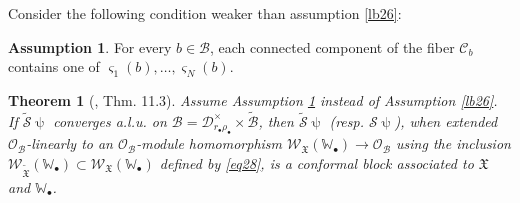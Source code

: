 \documentclass[12pt,a4paper,notitlepage]{article}
\theoremstyle{definition}
\newtheorem{rem}[df]{Remark}
\newtheorem{ass}[df]{Assumption}
\theoremstyle{plain}
\newtheorem{thm}[df]{Theorem}
\newcommand{\fk}{\mathfrak}
\newcommand{\mc}{\mathcal}
\newcommand{\wtd}{\widetilde}
\newcommand{\scr}{\mathscr}
\newcommand{\sgm}{\varsigma}
\newcommand{\blt}{\bullet}
\newcommand{\Wbb}{\mathbb W}
\newcommand{\Mbb}{\mathbb M}
\numberwithin{equation}{section}
\begin{document}

Consider the following condition weaker than assumption \ref{lb26}:
\begin{ass}\label{lb27}
For every $b\in\mc B$, each connected component of the fiber $\mc C_b$ contains one of $\sgm_1(b),\dots,\sgm_N(b)$.
\end{ass}

\begin{thm}[\cite{Gui20}, Thm. 11.3]\label{lb8}
Assume Assumption \ref{lb27} instead of Assumption \ref{lb26}. If $\wtd{\mc S}\uppsi$ converges a.l.u. on  $\mc B=\mc D_{r_\blt\rho_\blt}^\times\times\wtd{\mc B}$, then $\wtd{\mc S}\uppsi$ (resp. $\mc S\uppsi$), when extended $\scr O_{\mc B}$-linearly to an $\scr O_{\mc B}$-module homomorphism $\scr W_{\fk X}(\Wbb_\blt)\rightarrow\scr O_{\mc B}$ using the inclusion $\scr W_{\wtd{\fk X}}(\Wbb_\blt)\subset \scr W_{\fk X}(\Wbb_\blt)$ defined by \eqref{eq28},  is a conformal block associated to $\fk X$ and $\Wbb_\blt$. 
\end{thm}
\end{document}
